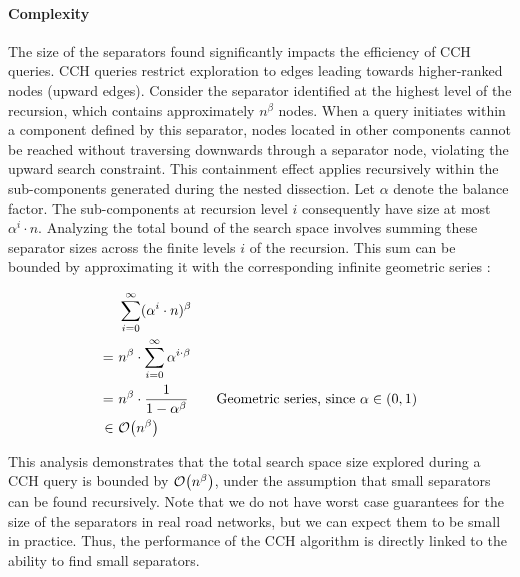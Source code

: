 \paragraph{Complexity}

The size of the separators found significantly impacts the efficiency of CCH queries.
CCH queries restrict exploration to edges leading towards higher-ranked nodes (upward edges).
Consider the separator identified at the highest level of the recursion, which contains approximately \(n^\beta\) nodes.
When a query initiates within a component defined by this separator, nodes located in other components cannot be reached without traversing downwards through a separator node, violating the upward search constraint.
This containment effect applies recursively within the sub-components generated during the nested dissection.
Let \( \alpha \) denote the balance factor.
The sub-components at recursion level \( i \) consequently have size at most \( \alpha^i \cdot n \).
Analyzing the total bound of the search space involves summing these separator sizes across the finite levels \(i\) of the recursion.
This sum can be bounded by approximating it with the corresponding infinite geometric series \cite{bauer_search-space_2016}:

\begin{align*}
	    & ~\sum_{i=0}^{\infty} (\alpha^i\cdot n)^\beta                                                         \\
	=   & ~n^\beta \cdot \sum_{i=0}^{\infty} \alpha^{i\cdot \beta}                                             \\
	=   & ~n^\beta \cdot \frac{1}{1 - \alpha^\beta} \qquad \text{Geometric series, since \(\alpha \in (0,1)\)} \\
	\in & ~\mathcal{O}\!\left(n^\beta\right)
\end{align*}

This analysis demonstrates that the total search space size explored during a CCH query is bounded by \(\mathcal{O}\!\left(n^\beta\right)\), under the assumption that small separators can be found recursively.
Note that we do not have worst case guarantees for the size of the separators in real road networks, but we can expect them to be small in practice.
Thus, the performance of the CCH algorithm is directly linked to the ability to find small separators.
